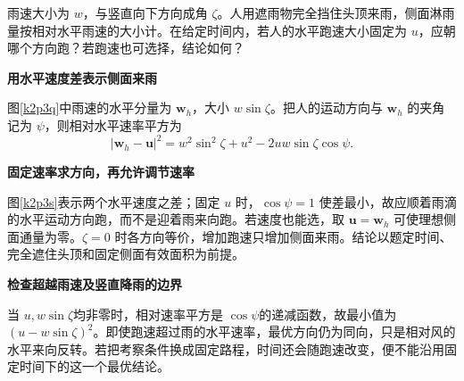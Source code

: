 \begin{question}\begin{example}[遮住头顶以后怎样避雨]\label{k2p3}
雨速大小为 $w$，与竖直向下方向成角 $\zeta$。人用遮雨物完全挡住头顶来雨，侧面淋雨量按相对水平雨速的大小计。在给定时间内，若人的水平跑速大小固定为 $u$，应朝哪个方向跑？若跑速也可选择，结论如何？\end{example}
\end{question}
\begin{solution}\textbf{用水平速度差表示侧面来雨}\par\nobreak
图\ref{k2p3q}中雨速的水平分量为 $\bm w_h$，大小 $w\sin\zeta$。把人的运动方向与 $\bm w_h$ 的夹角记为 $\psi$，则相对水平速率平方为
\[|\bm w_h-\bm u|^2=w^2\sin^2\zeta+u^2-2uw\sin\zeta\cos\psi.\]



\par\medskip{}\noindent\textbf{固定速率求方向，再允许调节速率}\par\nobreak
图\ref{k2p3s}表示两个水平速度之差；固定 $u$ 时，$\cos\psi=1$ 使差最小，故应顺着雨滴的水平运动方向跑，而不是迎着雨来向跑。若速度也能选，取 $\bm u=\bm w_h$ 可使理想侧面通量为零。$\zeta=0$ 时各方向等价，增加跑速只增加侧面来雨。结论以题定时间、完全遮住头顶和固定侧面有效面积为前提。



\par\medskip{}\noindent\textbf{检查超越雨速及竖直降雨的边界}\par\nobreak
当 $u,w\sin\zeta$均非零时，相对速率平方是 $\cos\psi$的递减函数，故最小值为 $(u-w\sin\zeta)^2$。即使跑速超过雨的水平速率，最优方向仍为同向，只是相对风的水平来向反转。若把考察条件换成固定路程，时间还会随跑速改变，便不能沿用固定时间下的这一个最优结论。\end{solution}

